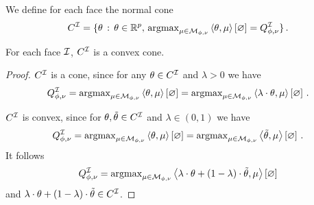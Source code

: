 We define for each face the normal cone
\begin{align*}
    C^{\mathcal{I}} = \{\theta\,:\,\theta\in\mathbb{R}^{p},\,\mathrm{argmax}_{\mu\in\mathcal{M}_{\phi,\nu}}\left\langle \theta,\mu\right\rangle \left[ \varnothing \right]=Q^{\mathcal{I}}_{\phi,\nu}\} \, .
\end{align*}


\begin{lemma}
    For each face $\mathcal{I}$, $C^{\mathcal{I}}$ is a convex cone. %
\end{lemma}
\begin{proof}
    $C^{\mathcal{I}}$ is a cone, since for any $\theta\in C^{\mathcal{I}}$ and $\lambda>0$ we have
    \begin{align*}
        Q^{\mathcal{I}}_{\phi,\nu} = \mathrm{argmax}_{\mu\in\mathcal{M}_{\phi,\nu}} \left\langle \theta,\mu\right\rangle \left[ \varnothing \right] = \mathrm{argmax}_{\mu\in\mathcal{M}_{\phi,\nu}} \left\langle \lambda\cdot\theta,\mu\right\rangle \left[ \varnothing \right] \, .
    \end{align*}

    $C^{\mathcal{I}}$ is convex, since for $\theta,\tilde{\theta}\in C^{\mathcal{I}}$ and $\lambda\in(0,1)$ we have
    \begin{align*}
        Q^{\mathcal{I}}_{\phi,\nu} = \mathrm{argmax}_{\mu\in\mathcal{M}_{\phi,\nu}} \left\langle \theta,\mu\right\rangle \left[ \varnothing \right] = \mathrm{argmax}_{\mu\in\mathcal{M}_{\phi,\nu}} \left\langle \tilde{\theta},\mu\right\rangle \left[ \varnothing \right] \, .
    \end{align*}
    It follows
    \begin{align*}
        Q^{\mathcal{I}}_{\phi,\nu} = \mathrm{argmax}_{\mu\in\mathcal{M}_{\phi,\nu}} \left\langle \lambda\cdot\theta+(1-\lambda)\cdot\tilde{\theta},\mu\right\rangle \left[ \varnothing \right]
    \end{align*}
    and $\lambda\cdot\theta+(1-\lambda)\cdot\tilde{\theta} \in C^{\mathcal{I}}$.

\end{proof}



